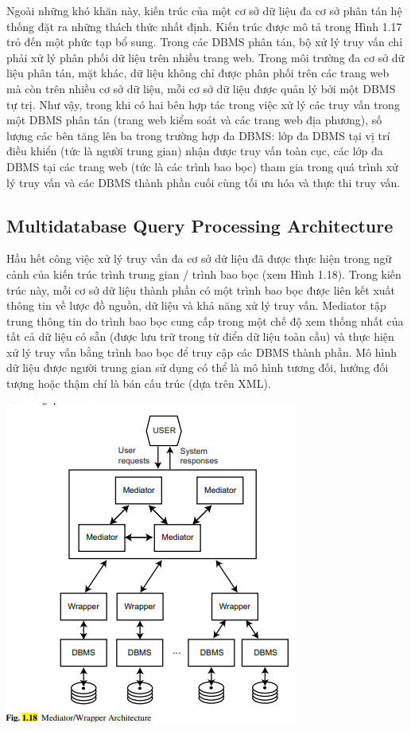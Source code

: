 \documentclass[a4paper]{article}
\begin{document}
Ngoài những khó khăn này, kiến trúc của một cơ sở dữ liệu đa cơ sở phân tán
hệ thống đặt ra những thách thức nhất định. Kiến trúc được mô tả trong Hình 1.17 trỏ đến một
phức tạp bổ sung. Trong các DBMS phân tán, bộ xử lý truy vấn chỉ phải xử lý
phân phối dữ liệu trên nhiều trang web. Trong môi trường đa cơ sở dữ liệu phân tán,
mặt khác, dữ liệu không chỉ được phân phối trên các trang web mà còn trên nhiều cơ sở dữ liệu, mỗi cơ sở dữ liệu được quản lý bởi một DBMS tự trị. Như vậy, trong khi có hai bên
hợp tác trong việc xử lý các truy vấn trong một DBMS phân tán (trang web kiểm soát
và các trang web địa phương), số lượng các bên tăng lên ba trong trường hợp
đa DBMS: lớp đa DBMS tại vị trí điều khiển (tức là người trung gian) nhận được
truy vấn toàn cục, các lớp đa DBMS tại các trang web (tức là các trình bao bọc) tham gia
trong quá trình xử lý truy vấn và các DBMS thành phần cuối cùng tối ưu hóa và thực thi
truy vấn.

\subsection{Multidatabase Query Processing Architecture}
Hầu hết công việc xử lý truy vấn đa cơ sở dữ liệu đã được thực hiện trong ngữ cảnh
của kiến trúc trình trung gian / trình bao bọc (xem Hình 1.18). Trong kiến trúc này, mỗi
cơ sở dữ liệu thành phần có một trình bao bọc được liên kết xuất thông tin về
lược đồ nguồn, dữ liệu và khả năng xử lý truy vấn. Mediator tập trung
thông tin do trình bao bọc cung cấp trong một chế độ xem thống nhất của tất cả dữ liệu có sẵn
(được lưu trữ trong từ điển dữ liệu toàn cầu) và thực hiện xử lý truy vấn bằng trình bao bọc
để truy cập các DBMS thành phần. Mô hình dữ liệu được người trung gian sử dụng có thể là mô hình tương đối, hướng đối tượng hoặc thậm chí là bán cấu trúc (dựa trên XML).

\includegraphics[width=0.8\linewidth]{image/3/1.18}
\end{document}
